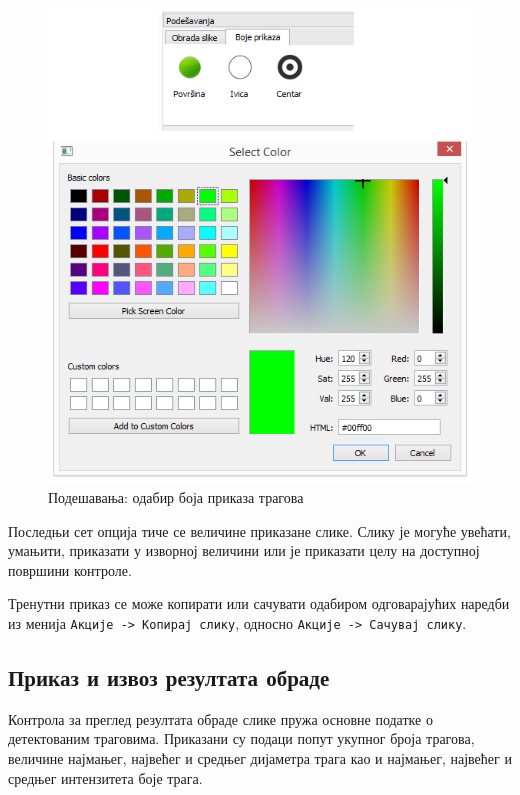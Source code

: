 \documentclass[11pt,a4paper,serbian,oneside]{book}
\begin{document}
\begin{figure}[H]
\begin{center}
\includegraphics[width=130mm]{images/colors.png}
\end{center}
\caption{Подешавања: одабир боја приказа трагова}
\label{fig:colors}
\end{figure}

Последњи сет опција тиче се величине приказане слике. Слику је могуће увећати, умањити, приказати у изворној величини или је приказати целу на доступној површини контроле.

Тренутни приказ се може копирати или сачувати одабиром одговарајућих наредби из менија \texttt{Акције -> Копирај слику}, односно \texttt{Акције -> Сачувај слику}.

\subsection{Приказ и извоз резултата обраде}

Контрола за преглед резултата обраде слике пружа основне податке о детектованим траговима. Приказани су подаци попут укупног броја трагова, величине најмањег, највећег и средњег дијаметра трага као и најмањег, највећег и средњег интензитета боје трага. 
\end{document}

